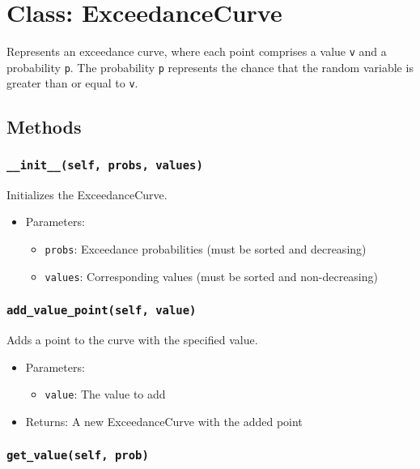 \documentclass{article}
\begin{document}
\section{Class: ExceedanceCurve}

Represents an exceedance curve, where each point comprises a value \texttt{v} and a probability \texttt{p}. The probability \texttt{p} represents the chance that the random variable is greater than or equal to \texttt{v}.

\subsection{Methods}

\subsubsection{\texttt{\_\_init\_\_(self, probs, values)}}

Initializes the ExceedanceCurve.

\begin{itemize}
    \item Parameters:
    \begin{itemize}
        \item \texttt{probs}: Exceedance probabilities (must be sorted and decreasing)
        \item \texttt{values}: Corresponding values (must be sorted and non-decreasing)
    \end{itemize}
\end{itemize}

\subsubsection{\texttt{add\_value\_point(self, value)}}

Adds a point to the curve with the specified value.

\begin{itemize}
    \item Parameters:
    \begin{itemize}
        \item \texttt{value}: The value to add
    \end{itemize}
    \item Returns: A new ExceedanceCurve with the added point
\end{itemize}

\subsubsection{\texttt{get\_value(self, prob)}}
\end{document}

